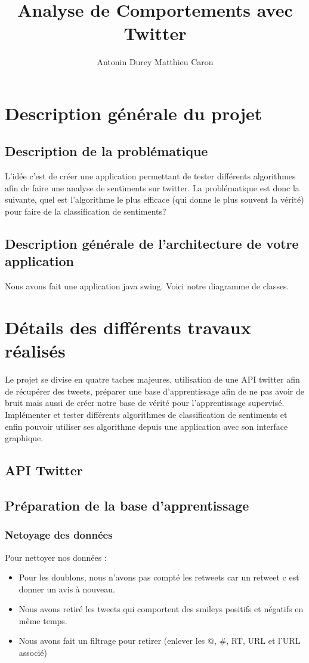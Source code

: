 \documentclass[a4paper,10pt]{report}
\title{Analyse de Comportements avec Twitter}
\author{Antonin Durey Matthieu Caron}
\begin{document}
\maketitle

\chapter{Description générale du projet}
  \section{Description de la problématique}
    L'idée c'est de créer une application permettant de tester différents algorithmes
    afin de faire une analyse de sentiments sur twitter. La problématique est donc la suivante,
    quel est l'algorithme le plus efficace (qui donne le plus souvent la vérité) pour faire de la 
    classification de sentiments?
  \section{Description générale de l'architecture de votre application}
    Nous avons fait une application java swing. Voici notre diagramme de classes.
\chapter{Détails des différents travaux réalisés}
  Le projet se divise en quatre taches majeures, utilisation de une API twitter afin de récupérer 
  des tweets, préparer une base d'apprentissage afin de ne pas avoir de bruit mais aussi de créer notre 
  base de vérité pour l'apprentissage supervisé. Implémenter et tester différents algorithmes de classification de sentiments et
  enfin pouvoir utiliser ses algorithme depuis une application avec son interface graphique.
  \section{API Twitter}
  \section{Préparation de la base d'apprentissage}
    \subsection{Netoyage des données}
      Pour nettoyer nos données :
      \begin{itemize}
       \item Pour les doublons, nous n'avons pas compté les retweets car un retweet c est donner un avis à nouveau.
       \item Nous avons retiré les tweets qui comportent des smileys positifs et négatifs en même temps.
       \item Nous avons fait un filtrage pour retirer  (enlever les @,  \#,  RT,  URL  et  l’URL  associé)
      \end{itemize}
\end{document}
